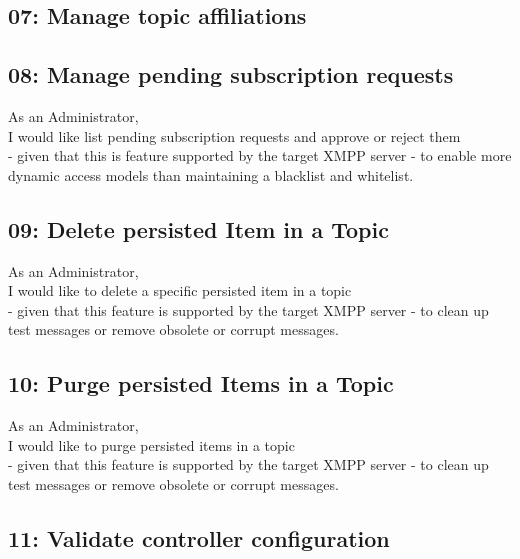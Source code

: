 
\subsection{07: Manage topic affiliations}


\subsection{08: Manage pending subscription requests}

As an Administrator,\\
I would like list pending subscription requests and approve or reject them\\
- given that this is feature supported by the target XMPP server -
to enable more dynamic access models than maintaining a blacklist and whitelist.

\subsection{09: Delete persisted Item in a Topic}

As an Administrator,\\
I would like to delete a specific persisted item in a topic\\
- given that this feature is supported by the target XMPP server -
to clean up test messages or remove obsolete or corrupt messages.

\subsection{10: Purge persisted Items in a Topic}

As an Administrator,\\
I would like to purge persisted items in a topic\\
- given that this feature is supported by the target XMPP server -
to clean up test messages or remove obsolete or corrupt messages.

\subsection{11: Validate controller configuration}

